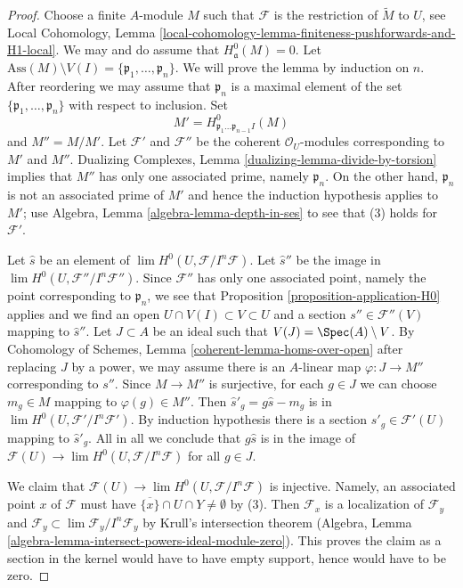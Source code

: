 \begin{proof}
Choose a finite $A$-module $M$ such that $\mathcal{F}$ is the restriction
of $\widetilde{M}$ to $U$, see Local Cohomology, Lemma
\ref{local-cohomology-lemma-finiteness-pushforwards-and-H1-local}.
We may and do assume that $H^0_\mathfrak a(M) = 0$.
Let $\text{Ass}(M) \setminus V(I) = \{\mathfrak p_1, \ldots, \mathfrak p_n\}$.
We will prove the lemma by induction on $n$. After reordering we
may assume that $\mathfrak p_n$ is a maximal element of the set
$\{\mathfrak p_1, \ldots, \mathfrak p_n\}$ with respect to inclusion.
Set
$$
M' = H^0_{\mathfrak p_1 \ldots \mathfrak p_{n - 1} I}(M)
$$
and $M'' = M/M'$. Let $\mathcal{F}'$ and $\mathcal{F}''$ be the
coherent $\mathcal{O}_U$-modules corresponding to $M'$ and $M''$.
Dualizing Complexes, Lemma \ref{dualizing-lemma-divide-by-torsion}
implies that $M''$ has only one associated prime, namely $\mathfrak p_n$.
On the other hand, $\mathfrak p_n$ is not an associated prime of $M'$
and hence the induction hypothesis applies to $M'$;
use Algebra, Lemma \ref{algebra-lemma-depth-in-ses}
to see that (3) holds for $\mathcal{F}'$.

\medskip\noindent
Let $\hat s$ be an element of $\lim H^0(U, \mathcal{F}/I^n\mathcal{F})$.
Let $\hat s''$ be the image in $\lim H^0(U, \mathcal{F}''/I^n\mathcal{F}'')$.
Since $\mathcal{F}''$ has only one associated point, namely the point
corresponding to $\mathfrak p_n$, we see that
Proposition \ref{proposition-application-H0} applies and we find an open
$U \cap V(I) \subset V \subset U$
and a section $s'' \in \mathcal{F}''(V)$ mapping to $\hat s''$.
Let $J \subset A$ be an ideal such that $V(J) = \Spec(A) \setminus V$.
By Cohomology of Schemes, Lemma \ref{coherent-lemma-homs-over-open}
after replacing $J$ by a power, we may assume
there is an $A$-linear map $\varphi : J \to M''$
corresponding to $s''$. Since $M \to M''$ is surjective, for
each $g \in J$ we can choose $m_g \in M$ mapping to
$\varphi(g) \in M''$. Then $\hat s'_g = g \hat s - m_g$
is in $\lim H^0(U, \mathcal{F}'/I^n\mathcal{F}')$.
By induction hypothesis there is a section $s'_g \in \mathcal{F}'(U)$
mapping to $\hat s'_g$. All in all we conclude that
$g \hat s$ is in the image of
$\mathcal{F}(U) \to \lim H^0(U, \mathcal{F}/I^n\mathcal{F})$
for all $g \in J$.

\medskip\noindent
We claim that
$\mathcal{F}(U) \to \lim H^0(U, \mathcal{F}/I^n\mathcal{F})$
is injective. Namely, an associated point $x$ of $\mathcal{F}$
must have $\overline{\{x\}} \cap U \cap Y \not = \emptyset$ by (3).
Then $\mathcal{F}_x$ is a localization of $\mathcal{F}_y$
and $\mathcal{F}_y \subset \lim \mathcal{F}_y/I^n \mathcal{F}_y$
by Krull's intersection theorem
(Algebra, Lemma \ref{algebra-lemma-intersect-powers-ideal-module-zero}).
This proves the claim as a section in the kernel would have to
have empty support, hence would have to be zero.


\end{proof}
